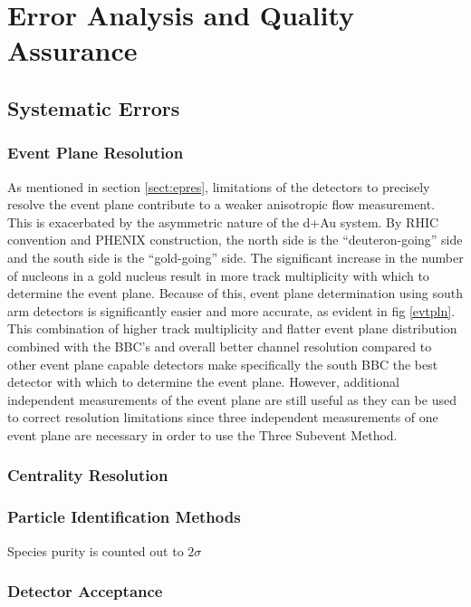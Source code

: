 
\chapter{Error Analysis and Quality Assurance} %

\section{Systematic Errors}
\subsection{Event Plane Resolution}
As mentioned in section \ref{sect:epres}, limitations of the detectors to precisely resolve the event plane contribute to a weaker anisotropic flow measurement. This is exacerbated by the asymmetric nature of the d+Au system. By RHIC convention and PHENIX construction, the north side is the ``deuteron-going'' side and the south side is the ``gold-going'' side. The significant increase in the number of nucleons in a gold nucleus result in more track multiplicity with which to determine the event plane. Because of this, event plane determination using south arm detectors is significantly easier and more accurate, as evident in fig \ref{evtpln}. This combination of higher track multiplicity and flatter event plane distribution combined with the BBC's and overall better channel resolution compared to other event plane capable detectors make specifically the south BBC the best detector with which to determine the event plane. However, additional independent measurements of the event plane are still useful as they can be used to correct resolution limitations since three independent measurements of one event plane are necessary in order to use the Three Subevent Method.

\subsection{Centrality Resolution}

\subsection{Particle Identification Methods}
Species purity is counted out to $2\sigma$
\subsection{Detector Acceptance}
